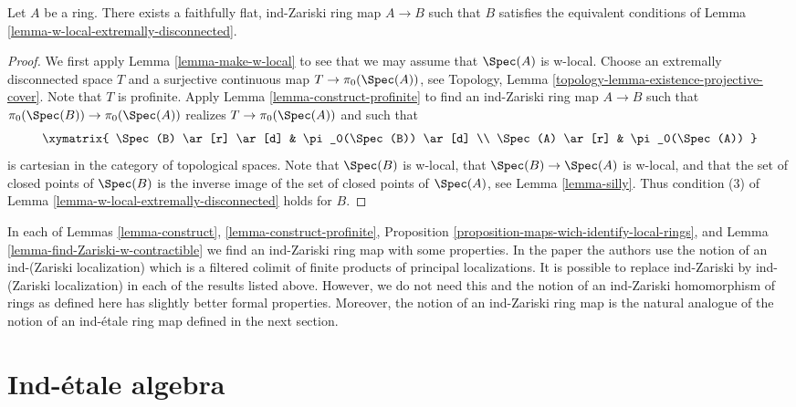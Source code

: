 \begin{lemma}
\label{lemma-find-Zariski-w-contractible}
Let $A$ be a ring. There exists a faithfully flat, ind-Zariski ring
map $A \to B$ such that $B$ satisfies the equivalent conditions
of Lemma \ref{lemma-w-local-extremally-disconnected}.
\end{lemma}

\begin{proof}
We first apply Lemma \ref{lemma-make-w-local} to see that we may assume that
$\Spec(A)$ is w-local.
Choose an extremally disconnected space $T$ and a surjective
continuous map $T \to \pi_0(\Spec(A))$, see
Topology, Lemma \ref{topology-lemma-existence-projective-cover}.
Note that $T$ is profinite. Apply Lemma \ref{lemma-construct-profinite}
to find an ind-Zariski ring map $A \to B$ such that
$\pi_0(\Spec(B)) \to \pi_0(\Spec(A))$ realizes $T \to \pi_0(\Spec(A))$
and such that
$$
\xymatrix{
\Spec(B) \ar[r] \ar[d] & \pi_0(\Spec(B)) \ar[d] \\
\Spec(A) \ar[r] & \pi_0(\Spec(A))
}
$$
is cartesian in the category of topological spaces. Note that $\Spec(B)$
is w-local, that $\Spec(B) \to \Spec(A)$ is w-local, and that the
set of closed points of $\Spec(B)$ is the inverse image of the
set of closed points of $\Spec(A)$, see Lemma \ref{lemma-silly}.
Thus condition (3) of
Lemma \ref{lemma-w-local-extremally-disconnected}
holds for $B$.
\end{proof}

\begin{remark}
\label{remark-slightly-stronger}
In each of Lemmas \ref{lemma-construct}, \ref{lemma-construct-profinite},
Proposition \ref{proposition-maps-wich-identify-local-rings}, and
Lemma \ref{lemma-find-Zariski-w-contractible} we find an ind-Zariski ring
map with some properties. In the paper \cite{BS} the authors use the notion
of an ind-(Zariski localization) which is a filtered colimit of finite
products of principal localizations. It is possible to replace ind-Zariski
by ind-(Zariski localization) in each of the results listed above.
However, we do not need this and the notion of an ind-Zariski homomorphism
of rings as defined here has slightly better formal properties. Moreover,
the notion of an ind-Zariski ring map is the natural analogue of the
notion of an ind-\'etale ring map defined in the next section.
\end{remark}




\section{Ind-\'etale algebra}
\label{section-ind-etale}

